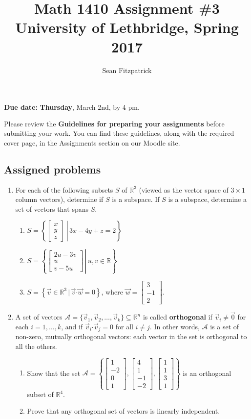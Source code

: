 \documentclass[letterpaper,12pt]{article}
\title{Math 1410 Assignment \#3\\University of Lethbridge, Spring 2017}
\author{Sean Fitzpatrick}
\newcommand{\R}{\mathbb{R}}
\newcommand{\dotp}{\boldsymbol{\cdot}}
\newcommand{\bbm}{\begin{bmatrix}}
\newcommand{\ebm}{\end{bmatrix}}
\begin{document}
 \maketitle

{\bf Due date:} {\bf Thursday}, March 2nd, by 4 pm.

\bigskip

Please review the {\bf Guidelines for preparing your assignments} before submitting your work. You can find these guidelines, along with the required cover page, in the Assignments section on our Moodle site.



\subsection*{Assigned problems}
\begin{enumerate}
\item For each of the following subsets $S$ of $\R^3$ (viewed as the vector space of $3\times 1$ column vectors), determine if $S$ is a subspace. If $S$ is a subspace, determine a set of vectors that spans $S$.
\begin{enumerate}
 \item $S = \left\{\left. \bbm x\\y\\z\ebm \,\right|\, 3x-4y+z=2\right\}$
 \item $S = \left\{\left. \bbm 2u-3v\\u\\v-5u\ebm \,\right|\, u,v\in \R\right\}$
 \item $S = \left\{\vec{v}\in\R^3 \,|\, \vec{v}\dotp \vec{w} =0\right\}$, where $\vec{w} = \bbm 3\\-1\\2\ebm$.
\end{enumerate}

\newpage

\item A set of vectors $\mathcal{A} = \{\vec{v}_1, \vec{v}_2, \ldots, \vec{v}_k\}\subseteq \R^n$ is called \textbf{orthogonal} if $\vec{v}_i \neq \vec{0}$ for each $i=1,\ldots, k$, and if $\vec{v}_i\dotp \vec{v}_j = 0$ for all $i\neq j$. In other words, $\mathcal{A}$ is a set of non-zero, mutually orthogonal vectors: each vector in the set is orthogonal to all the others.

\begin{enumerate}
 \item Show that the set $\mathcal{A} = \left\{\bbm 1\\-2\\0\\1\ebm, \bbm 4\\1\\-1\\-2\ebm, \bbm 1\\1\\3\\1\ebm\right\}$ is an orthogonal subset of $\R^4$.
 \item Prove that any orthogonal set of vectors is linearly independent.


\end{enumerate}
\end{enumerate}
\end{document}
